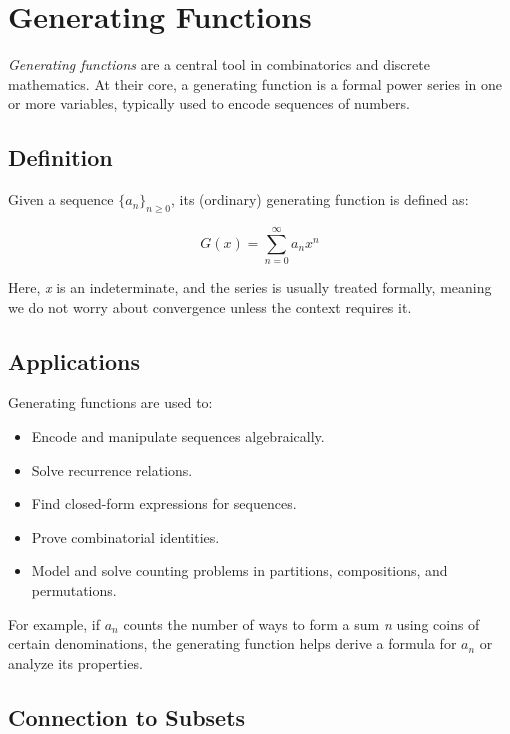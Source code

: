\newpage
\section{Generating Functions}

\emph{Generating functions} are a central tool in combinatorics and discrete mathematics. At their 
core, a generating function is a formal power series in one or more variables, 
typically used to encode sequences of numbers.

\subsection{Definition}

Given a sequence \( {\{a_n\}}_{n \ge 0} \), its (ordinary) generating function is defined as:

\[
    G(x) = \sum_{n=0}^{\infty} a_n x^n
\]

Here, \emph{x} is an indeterminate, and the series is usually treated formally, meaning we do not 
worry about convergence unless the context requires it.

\subsection{Applications}

Generating functions are used to:

\begin{itemize}

    \item Encode and manipulate sequences algebraically.

    \item Solve recurrence relations.

    \item Find closed-form expressions for sequences.

    \item Prove combinatorial identities.

    \item Model and solve counting problems in partitions, compositions, and permutations.

\end{itemize}

For example, if \( a_n \) counts the number of ways to form a sum \emph{n} using coins of certain 
denominations, the generating function helps derive a formula for \( a_n \) or analyze its properties.

\subsection{Connection to Subsets}

